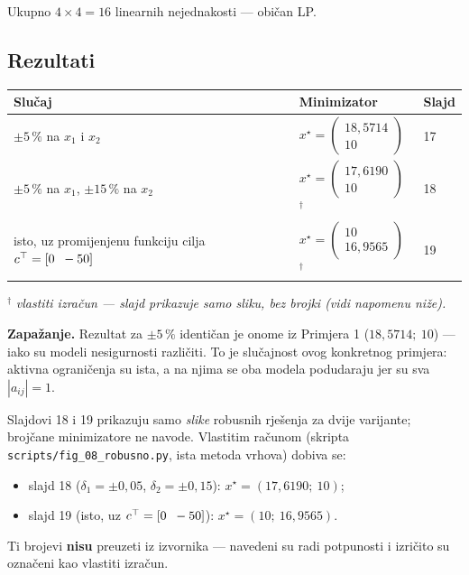 Ukupno $4 \times 4 = 16$ linearnih nejednakosti --- običan LP.

\subsection{Rezultati}

\begin{center}
\begin{tabular}{P{5.4cm}P{3.6cm}P{3.4cm}}
\toprule
\textbf{Slučaj} & \textbf{Minimizator} & \textbf{Slajd} \\
\midrule
$\pm5\,\%$ na $x_1$ i $x_2$
  & $x^\star = \begin{pmatrix}18{,}5714\\10\end{pmatrix}$ & 17 \\[8pt]
$\pm5\,\%$ na $x_1$, $\pm15\,\%$ na $x_2$
  & $x^\star = \begin{pmatrix}17{,}6190\\10\end{pmatrix}$\,$^\dagger$ & 18 \\[8pt]
isto, uz promijenjenu funkciju cilja $c^{\top} = [0\;\; -50]$
  & $x^\star = \begin{pmatrix}10\\16{,}9565\end{pmatrix}$\,$^\dagger$ & 19 \\
\bottomrule
\end{tabular}
\end{center}

$^\dagger$ \emph{vlastiti izračun --- slajd prikazuje samo sliku, bez brojki
(vidi napomenu niže).}

\textbf{Zapažanje.} Rezultat za $\pm5\,\%$ identičan je onome iz Primjera 1
($18{,}5714;\ 10$) --- iako su modeli nesigurnosti različiti. To je slučajnost
ovog konkretnog primjera: aktivna ograničenja su ista, a na njima se oba modela
podudaraju jer su sva $|a_{ij}| = 1$.

\begin{napomena}
Slajdovi 18 i 19 prikazuju samo \emph{slike} robusnih rješenja za dvije
varijante; brojčane minimizatore ne navode. Vlastitim računom
(skripta \texttt{scripts/fig\_08\_robusno.py}, ista metoda vrhova) dobiva se:
\begin{itemize}
  \item slajd 18 ($\delta_1 = \pm0{,}05$, $\delta_2 = \pm0{,}15$):
        $x^\star = (17{,}6190;\ 10)$;
  \item slajd 19 (isto, uz $c^{\top} = [0\;\; -50]$):
        $x^\star = (10;\ 16{,}9565)$.
\end{itemize}
Ti brojevi \textbf{nisu} preuzeti iz izvornika --- navedeni su radi potpunosti
i izričito su označeni kao vlastiti izračun.
\end{napomena}

